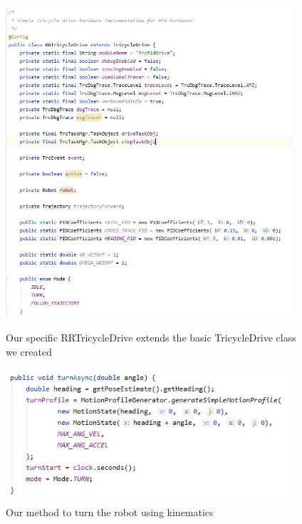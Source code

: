 \begin{figure}[ht]
\centering
\begin{minipage}[b]{.48\textwidth}
  \centering
  \includegraphics[width=0.95\textwidth]{Meetings/January/01-13-22/1-13-22 pic3 - James Hu.JPG}
  \caption{Our specific RRTricycleDrive extends the basic TricycleDrive class we created}
  \label{fig:011322_3}
\end{minipage}%
\hfill%
\begin{minipage}[b]{.48\textwidth}
  \centering
  \includegraphics[width=0.95\textwidth]{Meetings/January/01-13-22/1-13-22 pic4 - James Hu.JPG}
  \caption{Our method to turn the robot using kinematics}
  \label{fig:011322_4}
\end{minipage}
\end{figure}


